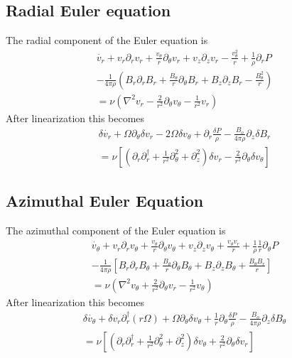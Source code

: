 \documentclass[letterpaper]{article}
\begin{document}
\subsection{Radial Euler equation}

The radial component of the Euler equation is
\begin{align}
\dot{v_r} + v_r \partial_r v_r + \frac{v_\theta}{r}\partial_\theta v_r + v_z \partial_z v_r - \frac{v_\theta^2}{r}+\frac{1}{\rho}\partial_r P 
\\ \nonumber 
- \frac{1}{4\pi\rho}\left(B_r \partial_r B_r + \frac{B_\theta}{r}\partial_\theta B_r + B_z \partial_z B_r - \frac{B_\theta^2}{r}\right)
\\ \nonumber
 = \nu\left(\nabla^2 v_r -\frac{2}{r^2}\partial_\theta v_\theta - \frac{1}{r^2}v_r\right)
\end{align}
After linearization this becomes
\begin{align}
\delta\dot{v_r} + \Omega \partial_\theta \delta v_r - 2\Omega\delta v_\theta + \partial_r \frac{\delta P}{\rho} - \frac{B_o}{4\pi\rho}\partial_z \delta B_r
\\ \nonumber
= \nu \left[\left(\partial_r \partial_r^\dagger + \frac{1}{r^2}\partial_\theta^2 + \partial_z^2\right)\delta v_r - \frac{2}{r^2}\partial_\theta \delta v_\theta\right]
\end{align}

\subsection{Azimuthal Euler Equation}
The azimuthal component of the Euler equation is
\begin{align}
\dot{v_\theta} + v_r \partial_r v_\theta + \frac{v_\theta}{r}\partial_\theta v_\theta + v_z \partial_z v_\theta + \frac{v_\theta v_r}{r} + \frac{1}{\rho}\frac{1}{r}\partial_\theta P 
\\ \nonumber
-\frac{1}{4\pi\rho}\left[B_r\partial_r B_\theta + \frac{B_\theta}{r}\partial_\theta B_\theta + B_z \partial_z B_\theta + \frac{B_\theta B_r}{r}\right]
\\ \nonumber
= \nu\left(\nabla^2 v_\theta + \frac{2}{r^2}\partial_\theta v_r - \frac{1}{r^2}v_\theta \right)
\end{align}
After linearization this becomes
\begin{align}
\delta \dot{v_\theta} + \delta v_r \partial_r^\dagger(r\Omega) + \Omega \partial_\theta \delta v_\theta + \frac{1}{r}\partial_\theta \frac{\delta P}{\rho} - \frac{B_o}{4\pi\rho} \partial_z \delta B_\theta
\\ \nonumber
= \nu\left[\left(\partial_r \partial_r^\dagger + \frac{1}{r^2}\partial_\theta^2 + \partial_z^2\right)\delta v_\theta + \frac{2}{r^2}\partial_\theta \delta v_r \right]
\end{align}
\end{document}

